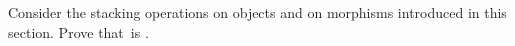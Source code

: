 {%

\begin{exercise}
    \label{ex:relassocstack}
    Consider the stacking operations on objects and on morphisms introduced in this section.
    Prove that~\RelL is .
\end{exercise}

}
